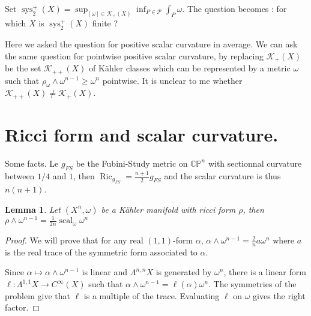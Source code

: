 \documentclass{amsart}
\newtheorem{lemma}[theorem]{Lemma}
\numberwithin{equation}{section}
\theoremstyle{definition}
\DeclareMathOperator{\scal}{scal}
\DeclareMathOperator{\Ric}{Ric}
\DeclareMathOperator{\sys}{sys}
\begin{document}
Set $\sys_2^+(X)=\sup_{[\omega]\in \mathcal{K}_+(X)}\inf_{P\in\mathcal{P}}\int_P\omega$. The question becomes : for which $X$ is $\sys_2^+(X)$ finite ?

Here we asked the question for positive scalar curvature in average. We can ask the same question for pointwise positive scalar curvature, by replacing $\mathcal{K}_+(X)$ be the set $\mathcal{K}_{++}(X)$ of K\"ahler classes which can be represented by a metric $\omega$ such that $\rho_\omega\wedge \omega^{n-1}\geq \omega^n$ pointwise. It is unclear to me whether $\mathcal{K}_{++}(X)\neq \mathcal{K}_{+}(X)$.

\appendix
\section{Ricci form and scalar curvature.}

Some facts. Le $g_{FS}$ be the Fubini-Study metric on $\mathbb{CP}^n$ with sectionnal curvature between $1/4$ and $1$, then $\Ric_{g_{FS}}=\frac{n+1}{2}g_{FS}$ and the scalar curvature is thus $n(n+1)$.


\begin{lemma}
    Let $(X^n,\omega)$ be a K\"ahler manifold with ricci form $\rho$, then $\rho\wedge \omega^{n-1}=\frac{1}{2n}\scal_\omega\omega^n$
\end{lemma}
\begin{proof}
    We will prove that for any real $(1,1)$-form $\alpha$,
    $\alpha\wedge \omega^{n-1}= \tfrac{2}{n}a\omega^n$ where $a$ is the real trace of the symmetric form associated to $\alpha$.

    Since $\alpha\mapsto \alpha\wedge\omega^{n-1}$ is linear and $\Lambda^{n,n}X$ is generated by $\omega^n$, there is a linear form $\ell:\Lambda^{1,1}X\to C^{\infty}(X)$ such that $\alpha\wedge\omega^{n-1}=\ell(\alpha)\omega^n$. The symmetries of the problem give that $\ell$ is a multiple of the trace. Evaluating $\ell$ on $\omega$ gives the right factor.


\end{proof}
\end{document}
